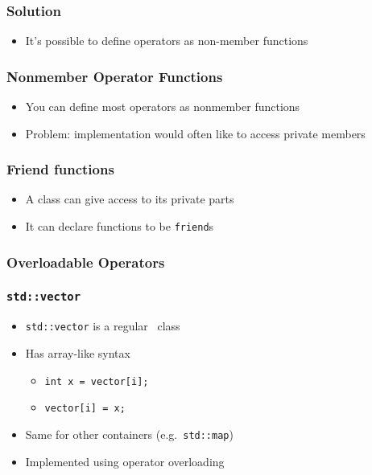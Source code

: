 \begin{frame}
  \frametitle{Solution}
  \begin{itemize}
    \item It's possible to define operators as non-member functions
  \end{itemize}
\end{frame}

\begin{frame}
  \frametitle{Nonmember Operator Functions}
  \begin{itemize}
    \item You can define most operators as nonmember functions
    \item Problem: implementation would often like to access private members
  \end{itemize}
\end{frame}

\begin{frame}
  \frametitle{Friend functions}
  \begin{itemize}
    \item A class can give access to its private parts
    \item It can declare functions to be {\tt friend}s
  \end{itemize}
\end{frame}

\begin{frame}
  \frametitle{Overloadable Operators}
  \begin{center}
  \end{center}
\end{frame}

\begin{frame}
  \frametitle{\tt std::vector}
  \begin{itemize}
    \item {\tt std::vector} is a regular \cpp\ class
    \item Has array-like syntax
      \begin{itemize}
        \item {\tt int x = vector[i];}
        \item {\tt vector[i] = x;}
      \end{itemize}
    \item Same for other containers (e.g.\ {\tt std::map})
    \item Implemented using operator overloading
  \end{itemize}
\end{frame}

